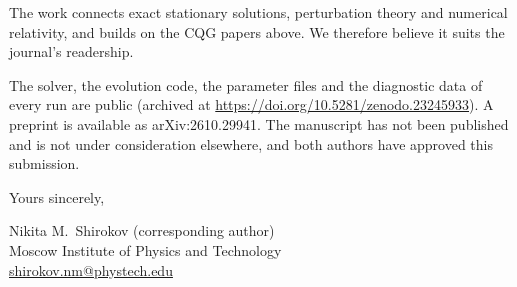 \documentclass[11pt]{article}
\begin{document}
The work connects exact stationary solutions, perturbation theory and numerical relativity, and builds on the CQG papers above. We therefore believe it suits the journal's readership.

The solver, the evolution code, the parameter files and the diagnostic data of every run are public (archived at \url{https://doi.org/10.5281/zenodo.23245933}). A preprint is available as arXiv:2610.29941. The manuscript has not been published and is not under consideration elsewhere, and both authors have approved this submission.

Yours sincerely,

Nikita M.\ Shirokov (corresponding author)\\
Moscow Institute of Physics and Technology\\
\href{mailto:shirokov.nm@phystech.edu}{shirokov.nm@phystech.edu}
\end{document}
